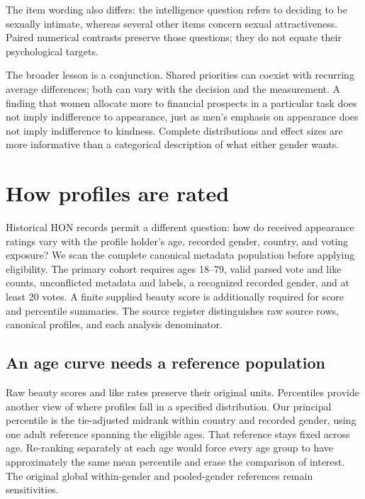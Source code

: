 The item wording also differs: the intelligence question refers to deciding to be sexually intimate, whereas several other items concern sexual attractiveness. Paired numerical contrasts preserve those questions; they do not equate their psychological targets.

The broader lesson is a conjunction. Shared priorities can coexist with recurring average differences; both can vary with the decision and the measurement. A finding that women allocate more to financial prospects in a particular task does not imply indifference to appearance, just as men's emphasis on appearance does not imply indifference to kindness. Complete distributions and effect sizes are more informative than a categorical description of what either gender wants.

\section{How profiles are rated}\label{sec:minds-ratings}

Historical HON records permit a different question: how do received appearance ratings vary with the profile holder's age, recorded gender, country, and voting exposure? We scan the complete canonical metadata population before applying eligibility. The primary cohort requires ages 18--79, valid parsed vote and like counts, unconflicted metadata and labels, a recognized recorded gender, and at least 20 votes. A finite supplied beauty score is additionally required for score and percentile summaries. The source register distinguishes raw source rows, canonical profiles, and each analysis denominator.



\subsection{An age curve needs a reference population}

Raw beauty scores and like rates preserve their original units. Percentiles provide another view of where profiles fall in a specified distribution. Our principal percentile is the tie-adjusted midrank within country and recorded gender, using one adult reference spanning the eligible ages. That reference stays fixed across age. Re-ranking separately at each age would force every age group to have approximately the same mean percentile and erase the comparison of interest. The original global within-gender and pooled-gender references remain sensitivities.


